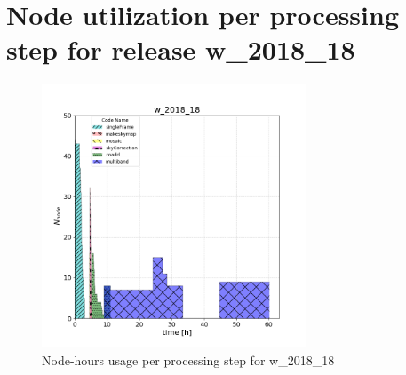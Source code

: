 \clearpage
\section{Node utilization per processing step for release w\_2018\_18}

\begin{figure}[h]
  \centering
  \includegraphics[width=0.70\textwidth]{figures/usage-w_2018_18.png}
  \caption{Node-hours usage per processing step for w\_2018\_18}
  \label{fig:PerTask18}
\end{figure}
